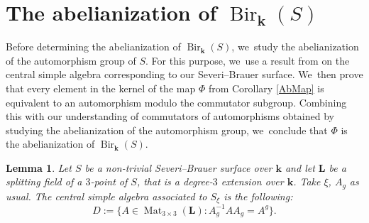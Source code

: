 \documentclass[JEP,XML,SOM,Unicode,NoFloatCountersInSection, NoEqCountersInSection,published]{cedram}
\DeclareMathOperator{\Mat}{Mat}
\newtheorem{lemma}[theorem]{Lemma}
\theoremstyle{definition}
\newcommand{\kk}{{\boldsymbol{k}}}
\newcommand{\LL}{{\boldsymbol{L}}}
\DeclareMathOperator{\Bir}{Bir}
\begin{document}
\section{The abelianization of \texorpdfstring{$\Bir_{\kk}(S)$}{Bir}}
Before determining the abelianization of $\Bir_{\kk}(S)$, we~study the abelianization of the automorphism group of $S$. For this purpose, we~use a result from \cite{Wang} on the central simple algebra corresponding to our Severi--Brauer surface. We~then prove that every element in the kernel of the map $\Phi$ from Corollary \ref{AbMap} is equivalent to an automorphism modulo the commutator subgroup. Combining this with our understanding of commutators of automorphisms obtained by studying the abelianization of the automorphism group, we~conclude that $\Phi$ is the abelianization of $\Bir_{\kk}(S)$.

\begin{lemma} \label{lem: csa}
Let $S$ be a non-trivial Severi--Brauer surface over $\kk$ and let $\LL$ be a splitting field of a $3$\nobreakdash-point of $S$, that is a degree-$3$ extension over $\kk$. Take $\xi$, $A_g$ as usual. The central simple algebra associated to $S_{\xi}$ is the following:
\[
D:= \{ A \in \Mat_{3\times 3}(\LL) : A_g^{-1}AA_g = A^g\}.
\]
\end{lemma}
\end{document}
